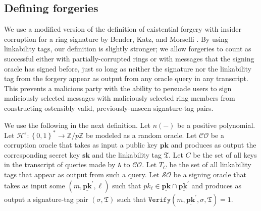 \documentclass{article}
\theoremstyle{plain}
\theoremstyle{definition}
\begin{document}
\subsection{Defining forgeries}
We use a modified version of the definition of existential forgery with insider corruption for a ring signature by Bender, Katz, and Morselli \cite{bender}. By using linkability tags, our definition is slightly stronger; we allow forgeries to count as successful either with partially-corrupted rings or with messages that the signing oracle has signed before, just so long as neither the signature nor the linkability tag from the forgery appear as output from any oracle query in any transcript. This prevents a malicious party with the ability to persuade users to sign maliciously selected messages with maliciously selected ring members from constructing ostensibly valid, previously-unseen signature-tag pairs.

We use the following in the next definition. Let $n(-)$ be a positive polynomial. Let $\mathcal{H}^s:\left\{0,1\right\}^* \to \mathbb{Z}/p\mathbb{Z}$ be modeled as a random oracle. Let $\mathcal{CO}$ be a corruption oracle that takes as input a public key $\textbf{pk}$ and produces as output the corresponding secret key $\textbf{sk}$ and the linkability tag $\mathfrak{T}$. Let $C$ be the set of all keys in the transcript of queries made by $\texttt{A}$ to $\mathcal{CO}$. Let $T_C$ be the set of all linkability tags that appear as output from such a query. Let $\mathcal{SO}$ be a signing oracle that takes as input some $(m, \underline{\textbf{pk}}^\prime, \ell)$ such that $pk_\ell \in \underline{\textbf{pk}} \cap \underline{\textbf{pk}^\prime}$ and produces as output a signature-tag pair $(\sigma, \mathfrak{T})$ such that $\texttt{Verify}(m, \underline{\textbf{pk}}^\prime, \sigma, \mathfrak{T}) = 1$.
\end{document}
